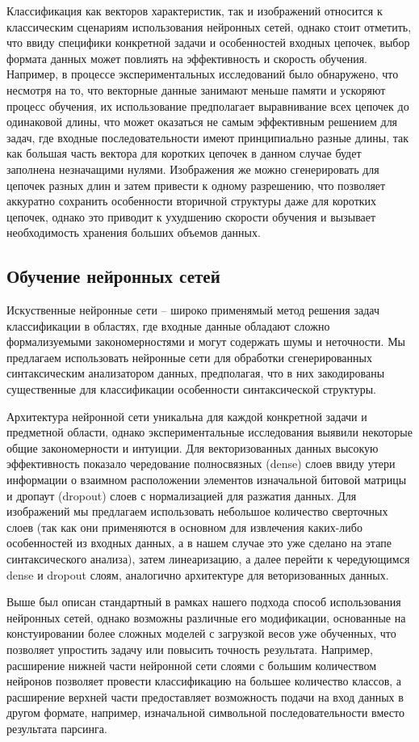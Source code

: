 \documentclass[14pt]{matmex-diploma-custom}
\begin{document}
Классификация как векторов характеристик, так и изображений относится к классическим сценариям использования нейронных сетей, однако стоит отметить, что ввиду специфики конкретной задачи и особенностей входных цепочек, выбор формата данных может повлиять на эффективность и скорость обучения. Например, в процессе экспериментальных исследований было обнаружено, что несмотря на то, что векторные данные занимают меньше памяти и ускоряют процесс обучения, их использование предполагает выравнивание всех цепочек до одинаковой длины, что может оказаться не самым эффективным решением для задач, где входные последовательности имеют принципиально разные длины, так как большая часть вектора для коротких цепочек в данном случае будет заполнена незначащими нулями. Изображения же можно сгенерировать для цепочек разных длин и затем привести к одному разрешению, что позволяет аккуратно сохранить особенности вторичной структуры даже для коротких цепочек, однако это приводит к ухудшению скорости обучения и вызывает необходимость хранения больших объемов данных. 

\subsection{Обучение нейронных сетей}
Искуственные нейронные сети -- широко применямый метод решения задач классификации в областях, где входные данные обладают сложно формализуемыми закономерностями и могут содержать шумы и неточности. Мы предлагаем использовать нейронные сети для обработки сгенерированных синтаксическим анализатором данных, предполагая, что в них закодированы существенные для классификации особенности синтаксической структуры.

Архитектура нейронной сети уникальна для каждой конкретной задачи и предметной области, однако экспериментальные исследования выявили некоторые общие закономерности и интуиции. Для векторизованных данных высокую эффективность показало чередование полносвязных (dense) слоев ввиду утери информации о взаимном расположении элементов изначальной битовой матрицы и дропаут (dropout) слоев с нормализацией для разжатия данных. Для изображений мы предлагаем использовать небольшое количество сверточных слоев (так как они применяются в основном для извлечения каких-либо особенностей из входных данных, а в нашем случае это уже сделано на этапе синтаксического анализа), затем линеаризацию, а далее перейти к чередующимся dense и dropout слоям, аналогично архитектуре для веторизованных данных.

Выше был описан стандартный в рамках нашего подхода способ использования нейронных сетей, однако возможны различные его модификации, основанные на констуировании более сложных моделей с загрузкой весов уже обученных, что позволяет упростить задачу или повысить точность результата. Например, расширение нижней части нейронной сети слоями с большим количеством нейронов позволяет провести классификацию на большее количество классов, а расширение верхней части предоставляет возможность подачи на вход данных в другом формате, например, изначальной символьной последовательности вместо результата парсинга.
\end{document}

